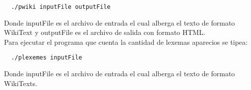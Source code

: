\documentclass[a4paper,11pt]{article}
\begin{document}
\begin{center}
 \begin{verbatim}
  ./pwiki inputFile outputFile 
 \end{verbatim}
\end{center}

Donde inputFile es el archivo de entrada el cual alberga el texto de formato WikiText y outputFile es el archivo de salida con formato HTML.\\

Para ejecutar el programa que cuenta la cantidad de lexemas aparecios se tipea: \\
\begin{center}
 \begin{verbatim}
  ./plexemes inputFile
 \end{verbatim}
\end{center}

Donde inputFile es el archivo de entrada el cual alberga el texto de formato WikiTexts.\\
\end{document}
